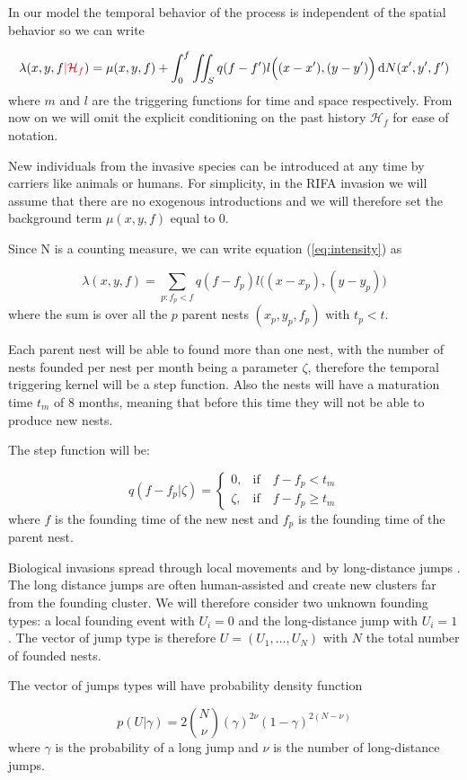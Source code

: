 \documentclass[11pt,a4paper]{article}
\renewcommand{\d}[1]{\ensuremath{\operatorname{d}\!{#1}}}
\begin{document}
In our model the temporal behavior of the process is independent of the spatial behavior so we can write

\begin{equation*}
    \lambda(x, y, f {\color{red}| \mathcal{H}_f}) = \mu(x, y, f) + \int_{0}^{f} \iint_{S} q(f-f') l\Big((x - x'), (y - y')\Big) \d N(x', y', f')
\end{equation*}
where $m$ and $l$ are the triggering functions for time and space respectively. {\color{red} From now on we will omit the explicit conditioning on the past history $\mathcal{H}_f$ for ease of notation.}

New individuals from the invasive species can be introduced at any time by carriers like animals or humans. For simplicity, in the RIFA invasion we will assume that there are no exogenous introductions and we will therefore set the background term $\mu(x, y, f) $ equal to 0.

{\color{red} Since N is a counting measure, we can write equation (\ref{eq:intensity}) as

\begin{equation*}
    \lambda(x, y, f) = \sum_{ p: f_p < f } q(f - f_p) l \Big((x - x_p),(y - y_p) \Big)
\end{equation*}
where the sum is over all the $p$ parent nests $(x_p, y_p, f_p)$ with $t_p < t$.}

Each parent nest will be able to found more than one nest, with the number of nests founded per nest per month being a parameter $\zeta$, therefore the temporal triggering kernel will be a step function. Also the nests will have a maturation time $t_m$ of 8 months, meaning that before this time they will not be able to produce new nests. 

The step function will be:

\begin{equation*}
    q (f - f_p | \zeta) =
    \begin{cases}
        0, & \mbox{if} \quad f - f_p < t_{m} \\
        \zeta, & \mbox{if} \quad f - f_p \geq t_{m}
    \end{cases}
\end{equation*}
where $f$ is the founding time of the new nest and $f_p$ is the founding time of the parent nest.

{\color{red} Biological invasions spread through local movements and by long-distance jumps \cite{Suarez}. The long distance jumps are often human-assisted and create new clusters far from the founding cluster. We will therefore consider two unknown founding types: a local founding event with $U_i = 0$ and the long-distance jump with $U_i = 1$. The vector of jump type is therefore $U = (U_1, \dots, U_N)$ with $N$ the total number of founded nests.

The vector of jumps types will have probability density function

\begin{equation*}
    p(U| \gamma ) = 2{N \choose \nu}(\gamma)^{2\nu}(1 - \gamma)^{2(N - \nu)}
\end{equation*}
where $\gamma$ is the probability of a long jump and $\nu$ is the number of long-distance jumps.}
\end{document}

